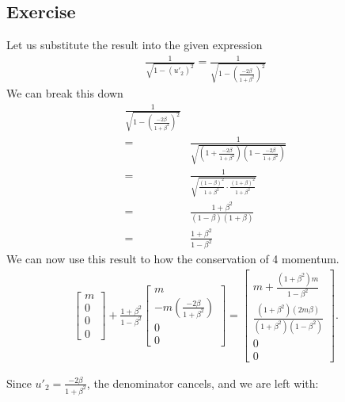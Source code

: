 \documentclass[12pt]{memoir}
\newcommand{\paren}[1]{\left( #1 \right)}
\begin{document}
        \subsection{Exercise}
        Let us substitute the result into the given expression
        \begin{align}
        \frac{1}{\sqrt{1-\paren{u'_2}^2}} = \frac{1}{\sqrt{1-\paren{\frac{-2\beta}{1+\beta^2}}^2}}
        \end{align}
        We can break this down
        \begin{align}
            \frac{1}{\sqrt{1-\paren{\frac{-2\beta}{1+\beta^2}}^2}}\\
            =& \frac{1}{\sqrt{\paren{1+\frac{-2\beta}{1+\beta^2}}\paren{1-\frac{-2\beta}{1+\beta^2}}}}\\
            =&\frac{1}{\sqrt{\frac{(1-\beta)^2}{1+\beta^2}\cdot \frac{(1+\beta)^2}{1+\beta^2}}}\\
            =&\frac{1+\beta^2}{\paren{1-\beta}\paren{1+\beta}}\\
            =&\frac{1+\beta^2}{1-\beta^2}
        \end{align}
        We can now use this result to how the conservation of 4 momentum.
        \begin{align}
        \begin{bmatrix}
            m \\
            0 \\
            0 \\
            0
        \end{bmatrix}
        +
        \frac{1 + \beta^2}{1 - \beta^2} 
        \begin{bmatrix}
            m \\
            -m \left(\frac{-2\beta}{1 + \beta^2}\right) \\
            0 \\
            0
        \end{bmatrix}
        =
        \begin{bmatrix}
            m + \frac{(1 + \beta^2)m}{1 - \beta^2} \\
            \frac{(1 + \beta^2)(2m\beta)}{(1 + \beta^2)(1 - \beta^2)} \\
            0 \\
            0
        \end{bmatrix}.
        \end{align}
        
        Since \( u'_2 = \frac{-2\beta}{1 + \beta^2} \), the denominator cancels, and we are left with:
        
\end{document}
